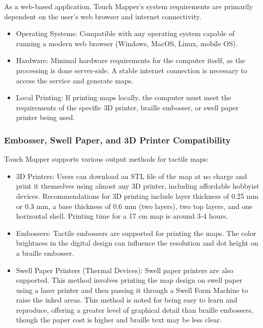As a web-based application, Touch Mapper's system requirements are primarily dependent on the user's web browser and internet connectivity.

\begin{itemize}
    \item Operating Systems: Compatible with any operating system capable of running a modern web browser (Windows, MacOS, Linux, mobile OS).\cite{AELData,NYUWorkflow,Ability2AccessTSS}
    \item Hardware: Minimal hardware requirements for the computer itself, as the processing is done server-side. A stable internet connection is necessary to access the service and generate maps.\cite{AELData,NYUWorkflow,Ability2AccessTSS}
    \item Local Printing: If printing maps locally, the computer must meet the requirements of the specific 3D printer, braille embosser, or swell paper printer being used.
\end{itemize}

\subsubsection{Embosser, Swell Paper, and 3D Printer Compatibility}

Touch Mapper supports various output methods for tactile maps:

\begin{itemize}
    \item 3D Printers: Users can download an STL file of the map at no charge and print it themselves using almost any 3D printer, including affordable hobbyist devices.\cite{AELData,NYUWorkflow,Ability2AccessTSS} Recommendations for 3D printing include layer thickness of 0.25 mm or 0.3 mm, a base thickness of 0.6 mm (two layers), two top layers, and one horizontal shell.\cite{AELData} Printing time for a 17 cm map is around 3-4 hours.\cite{AELData}
    \item Embossers: Tactile embossers are supported for printing the maps.\cite{NYUWorkflow} The color brightness in the digital design can influence the resolution and dot height on a braille embosser.\cite{DuxburyProducts}
    \item Swell Paper Printers (Thermal Devices): Swell paper printers are also supported.\cite{NYUWorkflow} This method involves printing the map design on swell paper using a laser printer and then passing it through a Swell Form Machine to raise the inked areas.\cite{DuxburyProducts} This method is noted for being easy to learn and reproduce, offering a greater level of graphical detail than braille embossers, though the paper cost is higher and braille text may be less clear.\cite{DuxburyProducts}
\end{itemize}

